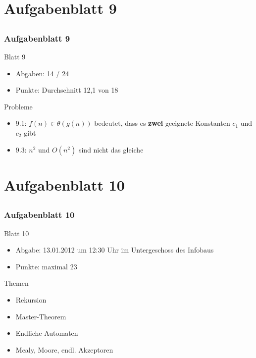 
\section[Rückblick Üb 9]{Aufgabenblatt 9}
\subsection*{}
\begin{frame}
	\frametitle{Aufgabenblatt 9}
	\begin{block}{Blatt 9}
		\begin{itemize}
			\item Abgaben: 14 / 24
			\item Punkte: Durchschnitt 12,1 von 18
		\end{itemize}
   \end{block}
	\begin{block}{Probleme}
 		\begin{itemize}
           \item 9.1: $f(n) \in \theta(g(n))$ bedeutet, dass es \textbf{zwei} geeignete Konstanten $c_1$ und $c_2$ gibt
           \item 9.3: $n^2$ und $O(n^2)$ sind nicht das gleiche
 	  \end{itemize}
	\end{block}
\end{frame}

\section[Blatt 10]{Aufgabenblatt 10}
\subsection*{}
\begin{frame}
	\frametitle{Aufgabenblatt 10}
	\begin{block}{Blatt 10}
		\begin{itemize}
			\item Abgabe: 13.01.2012 um 12:30 Uhr im Untergeschoss des Infobaus
			\item Punkte: maximal 23
		\end{itemize}
  	\end{block}
	\begin{block}{Themen}
		\begin{itemize}
        \item Rekursion
        \item Master-Theorem
	  		\item Endliche Automaten
	  		\item Mealy, Moore, endl. Akzeptoren
	 	\end{itemize}
	\end{block}
\end{frame}
